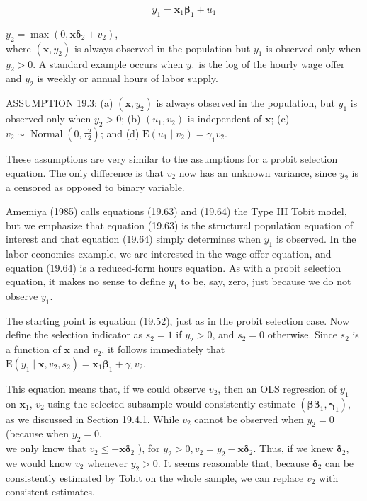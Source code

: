 \documentclass[10pt]{article}
\begin{document}
\begin{equation*}
y_{1}=\mathbf{x}_{1} \boldsymbol{\beta}_{1}+u_{1} \tag{19.63}
\end{equation*}


$y_{2}=\max \left(0, \mathbf{x} \boldsymbol{\delta}_{2}+v_{2}\right)$,\\
where $\left(\mathbf{x}, y_{2}\right)$ is always observed in the population but $y_{1}$ is observed only when $y_{2}>0$. A standard example occurs when $y_{1}$ is the log of the hourly wage offer and $y_{2}$ is weekly or annual hours of labor supply.

ASSUMPTION 19.3: (a) $\left(\mathbf{x}, y_{2}\right)$ is always observed in the population, but $y_{1}$ is observed only when $y_{2}>0$; (b) $\left(u_{1}, v_{2}\right)$ is independent of $\mathbf{x}$; (c) $v_{2} \sim \operatorname{Normal}\left(0, \tau_{2}^{2}\right)$; and (d) $\mathrm{E}\left(u_{1} \mid v_{2}\right)=\gamma_{1} v_{2}$.

These assumptions are very similar to the assumptions for a probit selection equation. The only difference is that $v_{2}$ now has an unknown variance, since $y_{2}$ is a censored as opposed to binary variable.

Amemiya (1985) calls equations (19.63) and (19.64) the Type III Tobit model, but we emphasize that equation (19.63) is the structural population equation of interest and that equation (19.64) simply determines when $y_{1}$ is observed. In the labor economics example, we are interested in the wage offer equation, and equation (19.64) is a reduced-form hours equation. As with a probit selection equation, it makes no sense to define $y_{1}$ to be, say, zero, just because we do not observe $y_{1}$.

The starting point is equation (19.52), just as in the probit selection case. Now define the selection indicator as $s_{2}=1$ if $y_{2}>0$, and $s_{2}=0$ otherwise. Since $s_{2}$ is a function of $\mathbf{x}$ and $v_{2}$, it follows immediately that\\
$\mathrm{E}\left(y_{1} \mid \mathbf{x}, v_{2}, s_{2}\right)=\mathbf{x}_{1} \boldsymbol{\beta}_{1}+\gamma_{1} v_{2}$.

This equation means that, if we could observe $v_{2}$, then an OLS regression of $y_{1}$ on $\mathbf{x}_{1}$, $v_{2}$ using the selected subsample would consistently estimate $\left(\boldsymbol{\beta} \boldsymbol{\beta}_{1}, \boldsymbol{\gamma}_{1}\right)$, as we discussed in Section 19.4.1. While $v_{2}$ cannot be observed when $y_{2}=0$ (because when $y_{2}=0$,\\
we only know that $v_{2} \leq-\mathbf{x} \boldsymbol{\delta}_{2}$ ), for $y_{2}>0, v_{2}=y_{2}-\mathbf{x} \boldsymbol{\delta}_{2}$. Thus, if we knew $\boldsymbol{\delta}_{2}$, we would know $v_{2}$ whenever $y_{2}>0$. It seems reasonable that, because $\boldsymbol{\delta}_{2}$ can be consistently estimated by Tobit on the whole sample, we can replace $v_{2}$ with consistent estimates.
\end{document}
